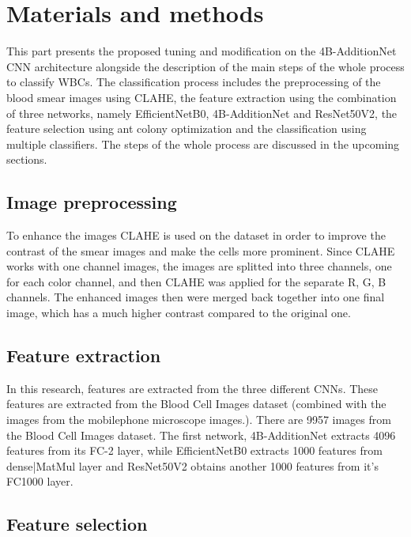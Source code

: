 \section{Materials and methods}\label{methods}

This part presents the proposed tuning and modification on the 4B-AdditionNet
CNN architecture alongside the description of the main steps of the whole process to classify WBCs. The classification process includes the preprocessing of the blood smear images using CLAHE, the feature extraction using the combination of three networks, namely EfficientNetB0, 4B-AdditionNet and ResNet50V2, the feature selection using ant colony optimization and the classification using multiple classifiers. The steps of the whole process are discussed in the upcoming sections.

\subsection{Image preprocessing}

To enhance the images CLAHE
is used on the dataset in order to improve the contrast of the smear images and make the cells more prominent. Since CLAHE works with one channel images, the images are splitted into three channels, one for each color channel, and then CLAHE was applied for the separate R, G, B channels. The enhanced images then were merged back together into one final image, which has a much higher contrast compared to the original one.

\subsection{Feature extraction}
In this research, features are extracted from the three different CNNs. These features are extracted from the Blood Cell Images dataset (combined with the images from the mobilephone microscope images.). There are 9957 images from the Blood Cell Images dataset. The first network, 4B-AdditionNet extracts 4096 features from its FC-2 layer, while EfficientNetB0 extracts 1000 features from dense|MatMul layer and ResNet50V2 obtains another 1000 features from it's FC1000 layer.


\subsection{Feature selection}

